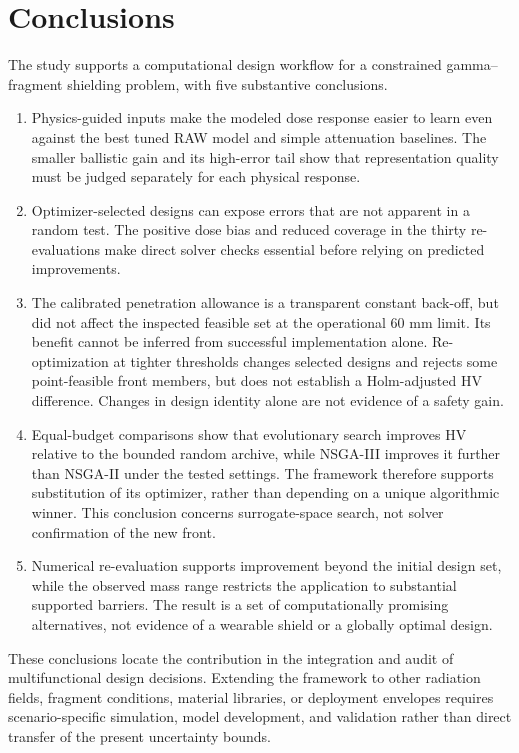 \documentclass[12pt]{elsarticle}
\begin{document}
\section{Conclusions}
The study supports a computational design workflow for a constrained gamma--fragment shielding problem, with five substantive conclusions.
\begin{enumerate}
\item Physics-guided inputs make the modeled dose response easier to learn even against the best tuned RAW model and simple attenuation baselines. The smaller ballistic gain and its high-error tail show that representation quality must be judged separately for each physical response.
\item Optimizer-selected designs can expose errors that are not apparent in a random test. The positive dose bias and reduced coverage in the thirty re-evaluations make direct solver checks essential before relying on predicted improvements.
\item The calibrated penetration allowance is a transparent constant back-off, but did not affect the inspected feasible set at the operational 60 mm limit. Its benefit cannot be inferred from successful implementation alone. Re-optimization at tighter thresholds changes selected designs and rejects some point-feasible front members, but does not establish a Holm-adjusted HV difference. Changes in design identity alone are not evidence of a safety gain.
\item Equal-budget comparisons show that evolutionary search improves HV relative to the bounded random archive, while NSGA-III improves it further than NSGA-II under the tested settings. The framework therefore supports substitution of its optimizer, rather than depending on a unique algorithmic winner. This conclusion concerns surrogate-space search, not solver confirmation of the new front.
\item Numerical re-evaluation supports improvement beyond the initial design set, while the observed mass range restricts the application to substantial supported barriers. The result is a set of computationally promising alternatives, not evidence of a wearable shield or a globally optimal design.
\end{enumerate}
These conclusions locate the contribution in the integration and audit of multifunctional design decisions. Extending the framework to other radiation fields, fragment conditions, material libraries, or deployment envelopes requires scenario-specific simulation, model development, and validation rather than direct transfer of the present uncertainty bounds.
\end{document}

